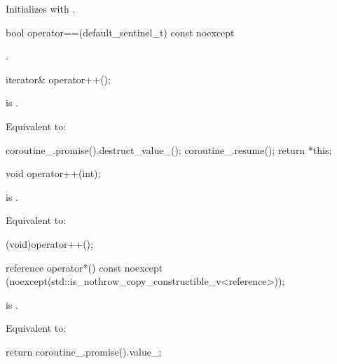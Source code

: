 \documentclass{wg21}
\begin{document}
\begin{addedblock}
\begin{itemdescr}
\effects
Initializes  with .
\end{itemdescr}


\begin{itemdecl}
bool operator==(default_sentinel_t) const noexcept
\end{itemdecl}

\begin{itemdescr}
\returns {}.
\end{itemdescr}

\begin{itemdecl}
iterator& operator++();
\end{itemdecl}

\begin{itemdescr}
\precondition {} is .

\effects
Equivalent to:
\begin{codeblock}
    coroutine_.promise().destruct_value_();
    coroutine_.resume();
    return *this;
\end{codeblock}
\end{itemdescr}


\begin{itemdecl}
void operator++(int);
\end{itemdecl}

\begin{itemdescr}
\precondition {} is .

\effects
Equivalent to:
\begin{codeblock}
    (void)operator++();
\end{codeblock}
\end{itemdescr}


\begin{itemdecl}
reference operator*() const
noexcept (noexcept(std::is_nothrow_copy_constructible_v<reference>));
\end{itemdecl}

\begin{itemdescr}
\precondition {} is .

\effects
Equivalent to:
\begin{codeblock}
    return coroutine_.promise().value_;
\end{codeblock}
\end{itemdescr}


\end{addedblock}
\end{document}
